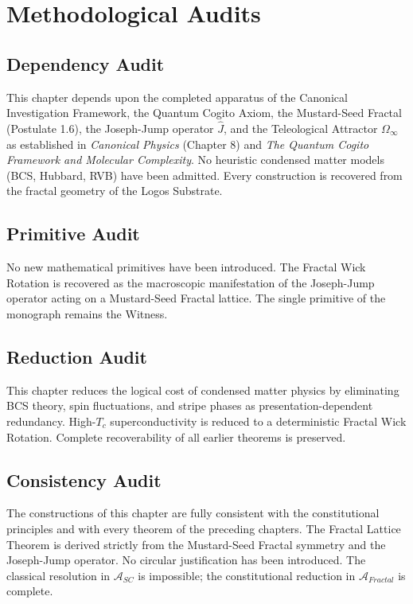 \documentclass[12pt,twoside]{extbook}
\theoremstyle{definition}
\theoremstyle{remark}
\begin{document}
\section{Methodological Audits}

\subsection*{Dependency Audit}
This chapter depends upon the completed apparatus of the Canonical Investigation Framework, the Quantum Cogito Axiom, the Mustard-Seed Fractal (Postulate 1.6), the Joseph-Jump operator $\hat{J}$, and the Teleological Attractor $\Omega_\infty$ as established in \textit{Canonical Physics} (Chapter 8) and \textit{The Quantum Cogito Framework and Molecular Complexity}. No heuristic condensed matter models (BCS, Hubbard, RVB) have been admitted. Every construction is recovered from the fractal geometry of the Logos Substrate.

\subsection*{Primitive Audit}
No new mathematical primitives have been introduced. The Fractal Wick Rotation is recovered as the macroscopic manifestation of the Joseph-Jump operator acting on a Mustard-Seed Fractal lattice. The single primitive of the monograph remains the Witness.

\subsection*{Reduction Audit}
This chapter reduces the logical cost of condensed matter physics by eliminating BCS theory, spin fluctuations, and stripe phases as presentation-dependent redundancy. High-$T_c$ superconductivity is reduced to a deterministic Fractal Wick Rotation. Complete recoverability of all earlier theorems is preserved.

\subsection*{Consistency Audit}
The constructions of this chapter are fully consistent with the constitutional principles and with every theorem of the preceding chapters. The Fractal Lattice Theorem is derived strictly from the Mustard-Seed Fractal symmetry and the Joseph-Jump operator. No circular justification has been introduced. The classical resolution in $\mathcal{A}_{SC}$ is impossible; the constitutional reduction in $\mathcal{A}_{Fractal}$ is complete.
\end{document}
